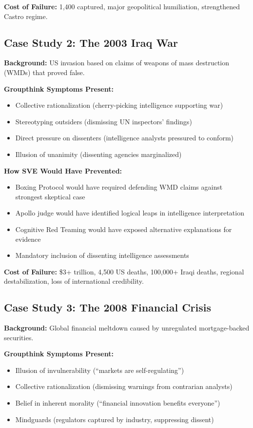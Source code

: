 \documentclass[11pt,a4paper]{article}
\begin{document}
\begin{small}
\textbf{Cost of Failure:} 1,400 captured, major geopolitical humiliation, strengthened Castro regime.

\subsection*{Case Study 2: The 2003 Iraq War}

\textbf{Background:} US invasion based on claims of weapons of mass destruction (WMDs) that proved false.

\textbf{Groupthink Symptoms Present:}
\begin{itemize}[nosep]
    \item Collective rationalization (cherry-picking intelligence supporting war)
    \item Stereotyping outsiders (dismissing UN inspectors' findings)
    \item Direct pressure on dissenters (intelligence analysts pressured to conform)
    \item Illusion of unanimity (dissenting agencies marginalized)
\end{itemize}

\textbf{How SVE Would Have Prevented:}
\begin{itemize}[nosep]
    \item Boxing Protocol would have required defending WMD claims against strongest skeptical case
    \item Apollo judge would have identified logical leaps in intelligence interpretation
    \item Cognitive Red Teaming would have exposed alternative explanations for evidence
    \item Mandatory inclusion of dissenting intelligence assessments
\end{itemize}

\textbf{Cost of Failure:} \$3+ trillion, 4,500 US deaths, 100,000+ Iraqi deaths, regional destabilization, loss of international credibility.

\subsection*{Case Study 3: The 2008 Financial Crisis}

\textbf{Background:} Global financial meltdown caused by unregulated mortgage-backed securities.

\textbf{Groupthink Symptoms Present:}
\begin{itemize}[nosep]
    \item Illusion of invulnerability (``markets are self-regulating'')
    \item Collective rationalization (dismissing warnings from contrarian analysts)
    \item Belief in inherent morality (``financial innovation benefits everyone'')
    \item Mindguards (regulators captured by industry, suppressing dissent)
\end{itemize}


\end{small}
\end{document}
